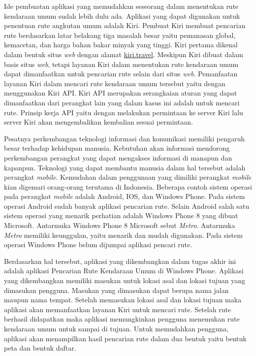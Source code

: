 Ide pembuatan aplikasi yang memudahkan seseorang dalam menentukan rute kendaraan umum sudah lebih dulu ada. Aplikasi yang dapat digunakan untuk penentuan rute angkutan umum adalah Kiri. Pembuat Kiri membuat pencarian rute berdasarkan latar belakang tiga masalah besar yaitu pemanasan global, kemacetan, dan harga bahan bakar minyak yang tinggi\footnotemark[1]. Kiri pertama dikenal dalam bentuk situs \textit{web} dengan alamat \url{kiri.travel}. Meskipun Kiri dibuat dalam basis situs \textit{web}, tetapi layanan Kiri dalam menentukan rute kendaraan umum dapat dimanfaatkan untuk pencarian rute selain dari situs \textit{web}. Pemanfaatan layanan Kiri dalam mencari rute kendaraan umum tersebut yaitu dengan menggunakan Kiri API. Kiri API merupakan serangkaian aturan yang dapat dimanfaatkan dari perangkat lain yang dalam kasus ini adalah untuk mencari rute. Prinsip kerja API yaitu dengan melakukan permintaan ke server Kiri lalu server Kiri akan mengembalikan kembalian sesuai permintaan.

Pesatnya perkembangan teknologi informasi dan komunikasi memiliki pengaruh besar terhadap kehidupan manusia. Kebutuhan akan informasi mendorong perkembangan perangkat yang dapat mengakses informasi di manapun dan kapanpun. Teknologi yang dapat membantu manusia dalam hal tersebut adalah perangkat \textit{mobile}. Kemudahan dalam penggunaan yang dimiliki perangkat \textit{mobile} kian digemari orang-orang terutama di Indonesia. Beberapa contoh sistem operasi pada perangkat \textit{mobile} adalah Android, IOS, dan Windows Phone. Pada sistem operasi Android sudah banyak aplikasi pencarian rute. Selain Android salah satu sistem operasi yang menarik perhatian adalah Windows Phone 8 yang dibuat Microsoft. Antarmuka Windows Phone 8 Microsoft sebut \textit{Metro}. Antarmuka \textit{Metro} memiliki keunggulan, yaitu menarik dan mudah digunakan. Pada sistem operasi Windows Phone belum dijumpai aplikasi pencari rute.

Berdasarkan hal tersebut, aplikasi yang dikembangkan dalam tugas akhir ini adalah aplikasi Pencarian Rute Kendaraan Umum di Windows Phone. Aplikasi yang dikembangkan memiliki masukan untuk lokasi asal dan lokasi tujuan yang dimasukan pengguna. Masukan yang dimasukan dapat berupa nama jalan maupun nama tempat. Setelah memasukan lokasi asal dan lokasi tujuan maka aplikasi akan memanfaatkan layanan Kiri untuk mencari rute. Setelah rute berhasil didapatkan maka aplikasi memungkinkan pengguna menemukan rute kendaraan umum untuk sampai di tujuan. Untuk memudahkan pengguna, aplikasi akan menampilkan hasil pencarian rute dalam dua bentuk yaitu bentuk peta dan bentuk daftar. 

